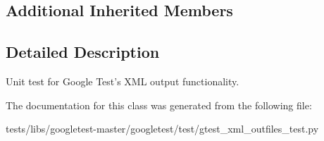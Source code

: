 \subsection*{Additional Inherited Members}


\subsection{Detailed Description}
\begin{DoxyVerb}Unit test for Google Test's XML output functionality.\end{DoxyVerb}
 

The documentation for this class was generated from the following file\+:\begin{DoxyCompactItemize}
\item 
tests/libs/googletest-\/master/googletest/test/gtest\+\_\+xml\+\_\+outfiles\+\_\+test.\+py\end{DoxyCompactItemize}
